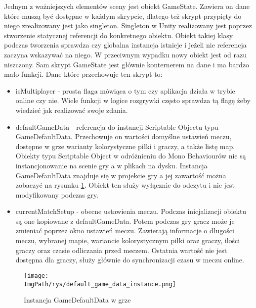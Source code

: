 \documentclass[a4paper,12pt,twoside,openany]{report}
\newcommand{\ImgPath}{.}
\begin{document}
Jednym z ważniejszych elementów sceny jest obiekt GameState. Zawiera on dane które muszą być dostępne w każdym skrypcie, dlatego też skrypt przypięty do niego zrealizowany jest jako singleton. Singleton w Unity realizowany jest poprzez stworzenie statycznej referencji do konkretnego obiektu. Obiekt takiej klasy podczas tworzenia sprawdza czy globalna instancja istnieje i jeżeli nie referencja zaczyna wskazywać na niego. W przeciwnym wypadku nowy obiekt jest od razu niszczony. Sam skrypt GameState jest głównie konternerem na dane i ma bardzo mało funkcji. Dane które przechowuje ten skrypt to:
\begin{itemize}
    \item isMultiplayer - prosta flaga mówiąca  o tym czy aplikacja działa w trybie online czy nie. Wiele funkcji w logice rozgrywki często sprawdza tą flagę żeby wiedzieć jak realizować swoje zdania.
    \item defaultGameData - referencja do instancji Scriptable Objectu typu GameDefaultData. Przechowuje on wartości domyślne ustawień meczu, dostępne w grze warianty kolorystyczne piłki i graczy, a także listę map. Obiekty typu Scriptable Object w odróżnieniu do Mono Behaviourów nie są instancjonowanie na scenie gry a w plikach na dysku. Instancja GameDefaultData znajduje się w projekcie gry a jej zawartość można zobaczyć na rysunku  \ref{default_game_data_instance}. Obiekt ten służy wyłącznie do odczytu i nie jest modyfikowany podczas gry.
    \item currentMatchSetup - obecne ustawienia meczu. Podczas inicjalizacji obiektu są one kopiowane z defaultGameData. Potem podczas gry gracz może je zmieniać poprzez okno ustawień meczu. Zawierają informacje o długości meczu, wybranej mapie, wariancie kolorystycznym piłki oraz graczy, ilości graczy oraz czasie odliczania przed meczem. Ostatnia wartość nie jest dostępna dla graczy, służy głównie do synchronizacji czasu w meczu online.
\end{itemize}

\begin{figure}[H]
	\begin{center}
\centering
\texttt{[image: \\ImgPath/rys/default\_game\_data\_instance.png]}
\end{center}
	\caption{Instancja GameDefaultData w grze}
	\label{default_game_data_instance}
\end{figure}
\end{document}
